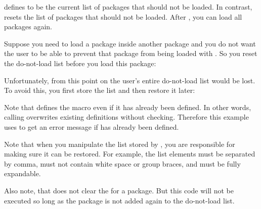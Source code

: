 \begin{Declaration}
\end{Declaration}
defines  to be the current list of packages that should not be
loaded. In contrast,
resets the list of packages that should not be loaded. After
, you can load all packages again.
\begin{Example}
  Suppose you need to load a package inside another package and you do not
  want the user to be able to prevent that package from being loaded with
  . So you reset the do-not-load list
  before you load this package:
\begin{lstcode}
  \ResetPreventPackageFromLoading
  \RequirePackage{foo}
\end{lstcode}
  Unfortunately, from this point on the user's entire do-not-load list would
  be lost. To avoid this, you first store the list and then restore it later:
\begin{lstcode}
  \newcommand*{\Users@PreventList}{}%
  \StorePreventPackageFromLoading\Users@PreventList
  \ResetPreventPackageFromLoading
  \RequirePackage{foo}
  \PreventPackageFromLoading{\Users@PreventList}
\end{lstcode}
  Note that 
  defines the  macro even if it has already been
  defined. In other words, calling 
  overwrites existing  definitions without checking. Therefore
  this example uses  to get an error message if
   has already been defined.
\end{Example}
Note that when you manipulate the list stored by
, you are responsible for making sure it
can be restored. For example, the list elements must be separated by comma,
must not contain white space or group braces, and must be fully expandable.

Also note, that 
does not clear the  for a package. But this code
will not be executed so long as the package is not added again to the
do-not-load list.%
\EndIndexGroup


